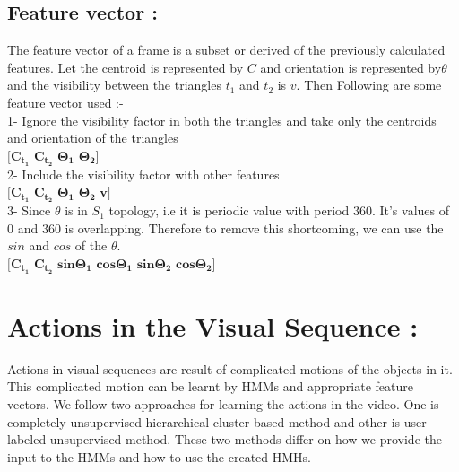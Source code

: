 \def\DevnagVersion{2.15}\documentclass[a4paper, 11pt, notitlepage]{report}
\begin{document}
\subsection{Feature vector :}
The feature vector of a frame is a subset or derived of the previously calculated features. Let the centroid is represented by $C$ and orientation is represented by$\theta$ and the visibility between the triangles $t_1$ and $t_2$ is $v$. Then Following are some feature vector used :-\\

1- Ignore the visibility factor in both the triangles and take only the centroids and orientation of the triangles \\
\hspace*{20pt}  $\mathbf{[C_{t_1}}$ $\mathbf{C_{t_2}}$ $\mathbf{\Theta_1}$ $\mathbf{\Theta_2]}$\\
\hspace*{15pt}2- Include the visibility factor with other features\\
\hspace*{20pt} $\mathbf{[C_{t_1}}$ $\mathbf{C_{t_2}}$ $\mathbf{\Theta_1}$ $\mathbf{\Theta_2}$ $\mathbf{v]}$\\
\hspace*{15pt}3- Since $\theta$ is in $S_1$ topology, i.e it is periodic value with period $360$. It's values of $0$ and $360$ is overlapping. Therefore to remove this shortcoming, we can use the $sin$ and $cos$ of the $\theta$.\\
\hspace*{20pt} $\mathbf{[C_{t_1}}$  $\mathbf{C_{t_2}}$  $\mathbf{sin\Theta_1}$  $\mathbf{cos\Theta_1}$  $\mathbf{sin\Theta_2}$  $\mathbf{cos\Theta_2]}$\\

\hspace*{10pt} \section{Actions in the Visual Sequence :}
Actions in visual sequences are result of complicated motions of the objects in it. This complicated motion can be learnt by HMMs and appropriate feature vectors. We follow two approaches for learning the actions in the video. One is completely unsupervised hierarchical cluster based method and other is user labeled unsupervised method. These two methods differ on how we provide the input to the HMMs and how to use the created HMHs.\\

\noindent \colorbox{gray}{\hspace{\linewidth}\hspace{-2\fboxsep}} 
\end{document}
